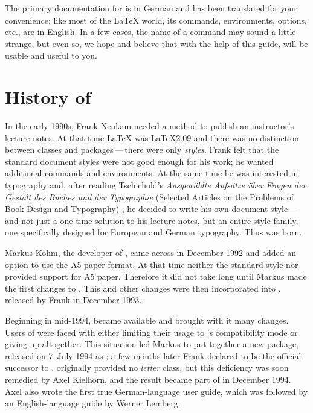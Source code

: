 \begin{Explain} 
  The primary documentation for {\KOMAScript} is in German and has been
  translated for your convenience; like most of the {\LaTeX} world, its
  commands, environments, options, etc., are in English. In a few cases, the
  name of a command may sound a little strange, but even so, we hope and
  believe that with the help of this guide, {\KOMAScript} will be usable
  and useful to you.
\end{Explain}


\section{History of {\KOMAScript}}\label{sec:introduction.history}

In the early 1990s, Frank Neukam needed a method to publish an
instructor's lecture notes. At that time {\LaTeX} was {\LaTeX}2.09 and there
was no distinction between classes and packages\,---\,there were only
\emph{styles}.  Frank felt that the standard document styles were not
good enough for his work; he wanted additional commands and
environments. At the same time he was interested in typography and,
after reading Tschichold's \emph{Ausgew\"ahlte Aufs\"atze \"uber Fragen der
Gestalt des Buches und der Typographie} (Selected Articles on the
Problems of Book Design and Typography) \cite{JTsch87}, he decided to
write his own document style\,---\,and not just a one-time solution to his
lecture notes, but an entire style family, one specifically designed for
European and German typography. Thus {\Script} was born.

Markus Kohm, the developer of {\KOMAScript}, came across {\Script} in December
1992 and added an option to use the A5 paper format. At that time neither the
standard style nor {\Script} provided support for A5 paper. Therefore it did
not take long until Markus made the first changes to {\Script}. This and other
changes were then incorporated into {\ScriptII}, released by Frank in December
1993.

Beginning in mid-1994, {\LaTeXe} became available and brought with it
many changes. Users of {\ScriptII} were faced with either limiting their
usage to {\LaTeXe}'s compatibility mode or giving up {\Script}
altogether.  This situation led Markus to put together a new {\LaTeXe}
package, released on 7~July 1994 as {\KOMAScript}; a few months later
Frank declared {\KOMAScript} to be the official successor to {\Script}.
{\KOMAScript} originally provided no \emph{letter} class, but this
deficiency was soon remedied by Axel Kielhorn, and the result became part
of {\KOMAScript} in December 1994.  Axel also wrote the first true
German-language user guide, which was followed by an English-language
guide by Werner Lemberg.


